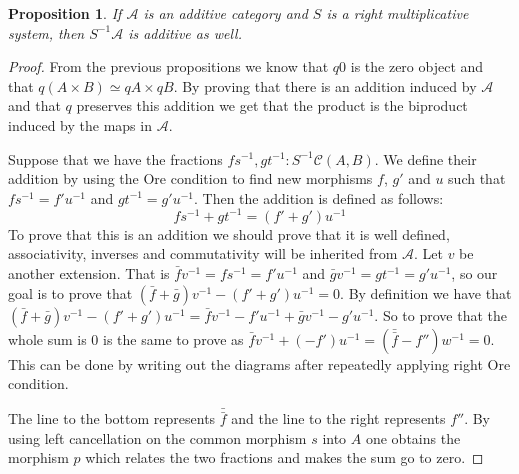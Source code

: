 \documentclass[12pt]{article}
\newtheorem{prop}[theorem]{Proposition}
\theoremstyle{definition}
\theoremstyle{remark}
\begin{document}
            \begin{prop}
                If $\mathcal{A}$ is an additive category and $S$ is a right multiplicative system, then $S^{-1}\mathcal{A}$ is additive as well.
            \end{prop}

            \begin{proof}
                From the previous propositions we know that $q0$ is the zero object and that $q(A\times B)\simeq qA\times qB$. By proving that there is an addition induced by $\mathcal{A}$ and that $q$ preserves this addition we get that the product is the biproduct induced by the maps in $\mathcal{A}$.

                Suppose that we have the fractions $fs^{-1}, gt^{-1}:S^{-1}\mathcal{C}(A,B)$. We define their addition by using the Ore condition  to find new morphisms $f$, $g'$ and $u$ such that $fs^{-1} = f'u^{-1}$ and $gt^{-1} = g'u^{-1}$. Then the addition is defined as follows:
                \begin{equation*}
                    fs^{-1}+gt^{-1} = (f'+g')u^{-1}
                \end{equation*}
                To prove that this is an addition we should prove that it is well defined, associativity, inverses and commutativity will be inherited from $\mathcal{A}$.
                Let $v$ be another extension. That is $\bar{f}v^{-1}=fs^{-1}=f'u^{-1}$ and $\bar{g}v^{-1}=gt^{-1}=g'u^{-1}$, so our goal is to prove that $(\bar{f}+\bar{g})v^{-1}-(f'+g')u^{-1}=0$. By definition we have that $(\bar{f}+\bar{g})v^{-1}-(f'+g')u^{-1}=\bar{f}v^{-1}-f'u^{-1}+\bar{g}v^{-1}-g'u^{-1}$. So to prove that the whole sum is $0$ is the same to prove as $\bar{f}v^{-1}+(-f')u^{-1}=(\bar{\bar{f}}-f'')w^{-1}=0$. This can be done by writing out the diagrams after repeatedly applying right Ore condition.
                \begin{center}
                \end{center}
                The line to the bottom represents $\bar{\bar{f}}$ and the line to the right represents $f''$. By using left cancellation on the common morphism $s$ into $A$ one obtains the morphism $p$ which relates the two fractions and makes the sum go to zero.


\end{proof}
\end{document}
